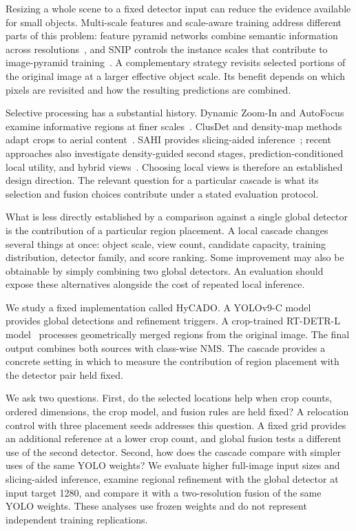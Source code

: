 \documentclass[journal]{IEEEtran}
\begin{document}
Resizing a whole scene to a fixed detector input can reduce the evidence available for small objects. Multi-scale features and scale-aware training address different parts of this problem: feature pyramid networks combine semantic information across resolutions~\cite{lin2017fpn}, and SNIP controls the instance scales that contribute to image-pyramid training~\cite{singh2018snip}. A complementary strategy revisits selected portions of the original image at a larger effective object scale. Its benefit depends on which pixels are revisited and how the resulting predictions are combined.

Selective processing has a substantial history. Dynamic Zoom-In and AutoFocus examine informative regions at finer scales~\cite{gao2018dynamic,najibi2019autofocus}. ClusDet and density-map methods adapt crops to aerial content~\cite{yang2019clusdet,li2020dmnet,duan2021cdmnet}. SAHI provides slicing-aided inference~\cite{akyon2022sahi}; recent approaches also investigate density-guided second stages, prediction-conditioned local utility, and hybrid views~\cite{xie2026dgtsod,chen2026mru,tang2026qashi}. Choosing local views is therefore an established design direction. The relevant question for a particular cascade is what its selection and fusion choices contribute under a stated evaluation protocol.

What is less directly established by a comparison against a single global detector is the contribution of a particular region placement. A local cascade changes several things at once: object scale, view count, candidate capacity, training distribution, detector family, and score ranking. Some improvement may also be obtainable by simply combining two global detectors. An evaluation should expose these alternatives alongside the cost of repeated local inference.

We study a fixed implementation called HyCADO. A YOLOv9-C model~\cite{wang2024yolov9} provides global detections and refinement triggers. A crop-trained RT-DETR-L model~\cite{zhao2024rtdetr} processes geometrically merged regions from the original image. The final output combines both sources with class-wise NMS. The cascade provides a concrete setting in which to measure the contribution of region placement with the detector pair held fixed.

We ask two questions. First, do the selected locations help when crop counts, ordered dimensions, the crop model, and fusion rules are held fixed? A relocation control with three placement seeds addresses this question. A fixed grid provides an additional reference at a lower crop count, and global fusion tests a different use of the second detector. Second, how does the cascade compare with simpler uses of the same YOLO weights? We evaluate higher full-image input sizes and slicing-aided inference, examine regional refinement with the global detector at input target 1280, and compare it with a two-resolution fusion of the same YOLO weights. These analyses use frozen weights and do not represent independent training replications.
\end{document}
